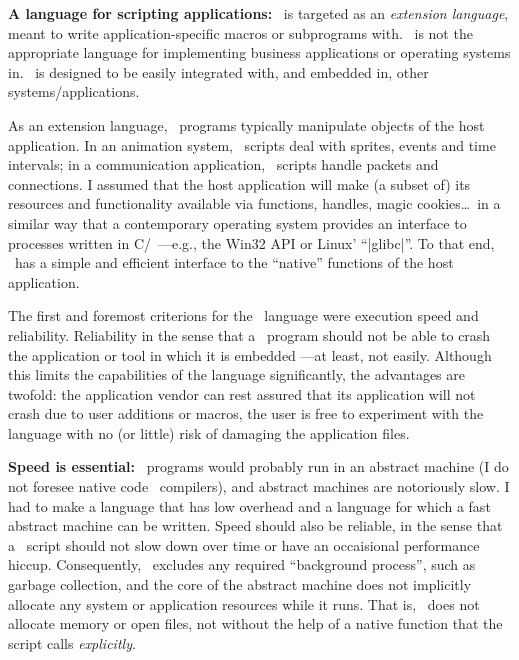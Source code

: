 {{%
{\bf A language for scripting applications:} \Small\ is targeted as an
{\it extension language}, meant to write application-specific macros or
subprograms with. \Small\ is not the appropriate language for implementing
business applications or operating systems in. \Small\ is designed to be easily
integrated with, and embedded in, other systems\slash applications.

As an extension language, \Small\ programs typically manipulate objects of the
host application. In an animation system, \Small\ scripts deal with sprites,
events and time intervals; in a communication application, \Small\ scripts handle
packets and connections. I assumed that the host application will make (a subset
of) its resources and functionality available via functions, handles, magic
cookies\dots\ in a similar way that a contemporary operating system provides an
interface to processes written in C/\Cpp\ ---e.g., the Win32 API or Linux' ``|glibc|''.
To that end, \Small\ has a simple and efficient interface to the ``native''
functions of the host application.

The first and foremost criterions for the \Small\ language were execution speed
and reliability. Reliability in the sense that a \Small\ program should not be
able to crash the application or tool in which it is embedded ---at least, not
easily. Although this limits the capabilities of the language significantly,
the advantages are twofold:
\beginlist{1em}\compactlist
\list{\lbullet} the application vendor can rest assured that its application
  will not crash due to user additions or macros,
\list{\lbullet} the user is free to experiment with the language with no (or
  little) risk of damaging the application files.
\endlist

{\bf Speed is essential:} \Small\ programs would probably run in an abstract
machine (I do not foresee native code \Small\ compilers), and abstract machines
are notoriously slow. I had to make a language that has low overhead and
a language for which a fast abstract machine can be written. Speed should
also be reliable, in the sense that a \Small\ script should not slow down over
time or have an occaisional performance hiccup. Consequently, \Small\ excludes
any required ``background process'', such as garbage collection, and the core
of the abstract machine does not implicitly allocate any system or application
resources while it runs. That is, \Small\ does not allocate memory or open files,
not without the help of a native function that the script calls {\it explicitly}.

}}
